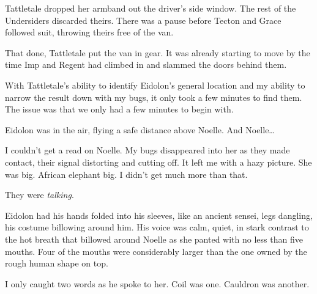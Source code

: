 Tattletale dropped her armband out the driver's side window.  The rest of the Undersiders discarded theirs.  There was a pause before Tecton and Grace followed suit, throwing theirs free of the van.



That done, Tattletale put the van in gear.   It was already starting to move by the time Imp and Regent had climbed in and slammed the doors behind them.



With Tattletale's ability to identify Eidolon's general location and my ability to narrow the result down with my bugs, it only took a few minutes to find them.  The issue was that we only had a few minutes to begin with.



Eidolon was in the air, flying a safe distance above Noelle.  And Noelle\ldots



I couldn't get a read on Noelle.  My bugs disappeared into her as they made contact, their signal distorting and cutting off.  It left me with a hazy picture.  She was big.  African elephant big.  I didn't get much more than that.



They were \emph{talking}.



Eidolon had his hands folded into his sleeves, like an ancient sensei, legs dangling, his costume billowing around him.  His voice was calm, quiet, in stark contrast to the hot breath that billowed around Noelle as she panted with no less than five mouths.  Four of the mouths were considerably larger than the one owned by the rough human shape on top.



I only caught two words as he spoke to her.  Coil was one.  Cauldron was another.





